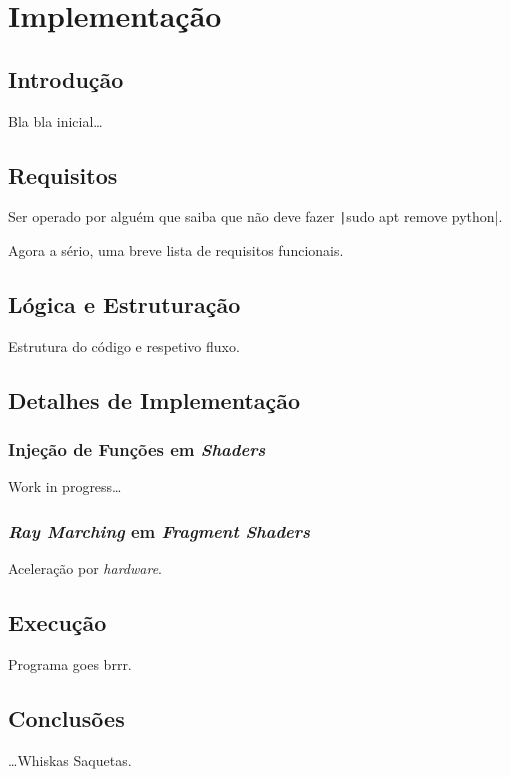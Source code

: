 \chapter{Implementação}
\label{ch::impl}

\section{Introdução}
\label{sec::impl:intro}

Bla bla inicial\ldots


\section{Requisitos}
\label{sec::impl:requisitos}

Ser operado por alguém que saiba que não deve fazer \texttt|sudo apt remove python|.

Agora a sério, uma breve lista de requisitos funcionais.


\section{Lógica e Estruturação}
\label{sec::impl:estrutura}

Estrutura do código e respetivo fluxo.


\section{Detalhes de Implementação}
\label{sec::impl:detalhes}

\subsection{Injeção de Funções em \emph{Shaders}}
\label{ssec::impl:detalhes:shaders}

Work in progress\ldots

\subsection{\emph{Ray Marching} em \emph{Fragment Shaders}}
\label{ssec::impl:detalhes:raymarch}

Aceleração por \textit{hardware}.


\section{Execução}
\label{sec::impl:exec}

Programa goes brrr.


\section{Conclusões}
\label{sec::impl:conc}

\ldots Whiskas Saquetas.
